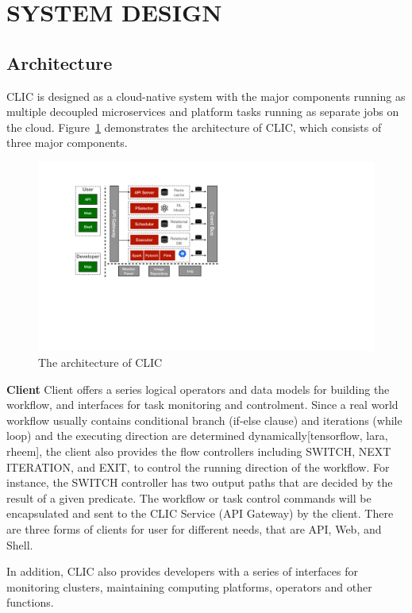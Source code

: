 \section{SYSTEM DESIGN}

\subsection{Architecture}
CLIC is designed as a cloud-native system with the major components running as multiple decoupled microservices and platform tasks running as separate jobs on the cloud.
Figure~\ref{fig:architecture} demonstrates the architecture of CLIC, which consists of three major components. 

\begin{figure}[tbh]
    \centering
    \includegraphics[width=0.8\linewidth]{figures/CLIC-arch-2.pdf}
    \caption{The architecture of CLIC}
    \label{fig:architecture}
\end{figure}


\textbf{Client}
Client offers a series logical operators and data models for building the workflow, and interfaces for task monitoring and controlment.
Since a real world workflow usually contains conditional branch (if-else clause) and iterations (while loop)
and the executing direction are determined dynamically[tensorflow, lara, rheem], 
the client also provides the flow controllers including SWITCH, NEXT ITERATION, and EXIT, to control the running direction of the workflow. 
For instance, the SWITCH controller has two output paths that are decided by the result of a given predicate.
The workflow or task control commands will be encapsulated and sent to the CLIC Service (API Gateway) by the client.
There are three forms of clients for user for different needs, that are API, Web, and Shell.

In addition, CLIC also provides developers with a series of interfaces for monitoring clusters, maintaining computing platforms, operators and other functions.

